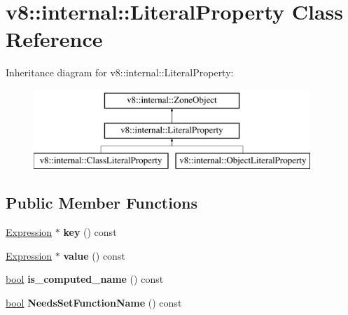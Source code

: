 \hypertarget{classv8_1_1internal_1_1LiteralProperty}{}\section{v8\+:\+:internal\+:\+:Literal\+Property Class Reference}
\label{classv8_1_1internal_1_1LiteralProperty}
Inheritance diagram for v8\+:\+:internal\+:\+:Literal\+Property\+:\begin{figure}[H]
\begin{center}
\leavevmode
\includegraphics[height=3.000000cm]{classv8_1_1internal_1_1LiteralProperty}
\end{center}
\end{figure}
\subsection*{Public Member Functions}
\begin{DoxyCompactItemize}
\item 
\mbox{\label{classv8_1_1internal_1_1LiteralProperty_aa70fb84a70bb1d464386f758534f7fe3}} 
\mbox{\hyperlink{classv8_1_1internal_1_1Expression}{Expression}} $\ast$ {\bfseries key} () const
\item 
\mbox{\label{classv8_1_1internal_1_1LiteralProperty_ab1eee601400fd67c67b8d973a539bd06}} 
\mbox{\hyperlink{classv8_1_1internal_1_1Expression}{Expression}} $\ast$ {\bfseries value} () const
\item 
\mbox{\label{classv8_1_1internal_1_1LiteralProperty_af230d73b62fae1133cc4b559e4d7a95c}} 
\mbox{\hyperlink{classbool}{bool}} {\bfseries is\+\_\+computed\+\_\+name} () const
\item 
\mbox{\label{classv8_1_1internal_1_1LiteralProperty_a79f1a5b1b2ea8da3c26ef757b1fd7eba}} 
\mbox{\hyperlink{classbool}{bool}} {\bfseries Needs\+Set\+Function\+Name} () const
\end{DoxyCompactItemize}
